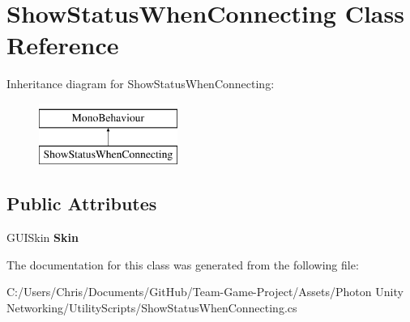 \hypertarget{class_show_status_when_connecting}{}\section{Show\+Status\+When\+Connecting Class Reference}
\label{class_show_status_when_connecting}
Inheritance diagram for Show\+Status\+When\+Connecting\+:\begin{figure}[H]
\begin{center}
\leavevmode
\includegraphics[height=2.000000cm]{class_show_status_when_connecting}
\end{center}
\end{figure}
\subsection*{Public Attributes}
\begin{DoxyCompactItemize}
\item 
G\+U\+I\+Skin {\bfseries Skin}\hypertarget{class_show_status_when_connecting_a8e289890414197e62154adeae8d2d679}{}\label{class_show_status_when_connecting_a8e289890414197e62154adeae8d2d679}

\end{DoxyCompactItemize}


The documentation for this class was generated from the following file\+:\begin{DoxyCompactItemize}
\item 
C\+:/\+Users/\+Chris/\+Documents/\+Git\+Hub/\+Team-\/\+Game-\/\+Project/\+Assets/\+Photon Unity Networking/\+Utility\+Scripts/Show\+Status\+When\+Connecting.\+cs\end{DoxyCompactItemize}
